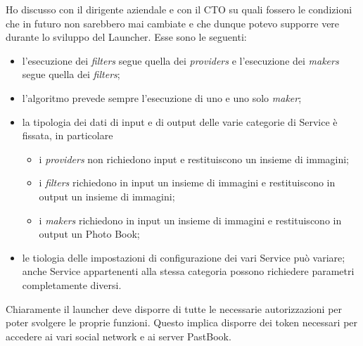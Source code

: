 				Ho discusso con il dirigente aziendale e con il CTO su quali fossero le condizioni che in futuro non sarebbero mai
				cambiate e che dunque potevo supporre vere durante lo sviluppo del Launcher. Esse sono le seguenti:
				\begin{itemize}
					\item l'esecuzione dei \emph{filters} segue quella dei \emph{providers} e l'esecuzione dei \emph{makers}
					segue quella dei \emph{filters};
					\item l'algoritmo prevede sempre l'esecuzione di uno e uno solo \emph{maker};
					\item la tipologia dei dati di input e di output delle varie categorie di Service è fissata, in particolare
					\begin{itemize}
						\item i \emph{providers} non richiedono input e restituiscono un insieme di immagini;
						\item i \emph{filters} richiedono in input un insieme di immagini e restituiscono in output un
						insieme di immagini;
						\item i \emph{makers} richiedono in input un insieme di immagini e restituiscono in output un Photo
						Book;
					\end{itemize}
					\item le tiologia delle impostazioni di configurazione dei vari Service può variare; anche Service
					appartenenti alla stessa categoria possono richiedere parametri completamente diversi.
				\end{itemize}
				Chiaramente il launcher deve disporre di tutte le necessarie autorizzazioni per poter svolgere le proprie funzioni.
				Questo implica disporre dei token necessari per accedere ai vari social network e ai server PastBook.
